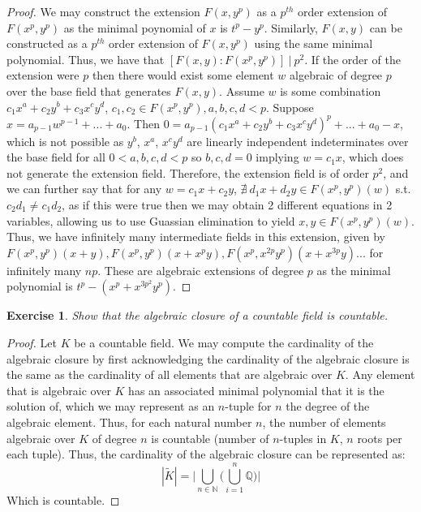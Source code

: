 \documentclass{article}
\newtheorem{exercise}{Exercise}
\begin{document}
\begin{proof}
  We may construct the extension $F(x,y^{p})$ as a $p^{th}$ order extension of $F(x^{p},y^{p})$ as the minimal poynomial of $x$ is $t^{p}-y^{p}$. Similarly, $F(x,y)$ can be constructed as a $p^{th}$ order extension of $F(x,y^{p})$ using the same minimal polynomial. Thus, we have that $[F(x,y):F(x^{p},y^{p})] \ | \  p^{2}$. If the order of the extension were $p$ then there would exist some element $w$ algebraic of degree $p$ over the base field that generates $F(x,y)$. Assume $w$ is some combination $c_{1}x^{a}+c_{2}y^{b}+c_{3}x^{c}y^{d}$, $c_{1},c_{2}\in F(x^{p},y^{p}), a,b,c,d < p$. Suppose $x = a_{p-1}w^{p-1}+...+a_{0}$. Then $0 = a_{p-1}(c_{1}x^{a}+c_{2}y^{b}+c_{3}x^{c}y^{d})^{p} + ... + a_{0} - x$, which is not possible as $y^{b}$, $x^{a}$, $x^{c}y^{d}$ are linearly independent indeterminates over the base field for all $0<a,b,c,d<p$ so $b,c,d = 0$ implying $w = c_{1}x$, which does not generate the extension field. Therefore, the extension field is of order $p^{2}$, and we can further say that for any $w = c_{1}x + c_{2}y$, $\nexists \ d_{1}x + d_{2}y \in F(x^{p},y^{p})(w)$ s.t. $c_{2}d_{1} \neq c_{1}d_{2}$, as if this were true then we may obtain 2 different equations in 2 variables, allowing us to use Guassian elimination to yield $x, y \in F(x^{p}, y^{p})(w)$. Thus, we have infinitely many intermediate fields in this extension, given by $F(x^{p},y^{p})(x+y), F(x^{p},y^{p})(x+x^{p}y), F(x^{p},x^{2p}y^{p})(x+x^{3p}y)...$ for infinitely many $np$. These are algebraic extensions of degree $p$ as the minimal polynomial is $t^{p} - (x^{p}+x^{3p^{2}}y^{p})$.
\end{proof}

\begin{exercise}
  Show that the algebraic closure of a countable field is countable.
\end{exercise}
\begin{proof}
  Let $K$ be a countable field. We may compute the cardinality of the algebraic closure by first acknowledging the cardinality of the algebraic closure is the same as the cardinality of all elements that are algebraic over $K$. Any element that is algebraic over $K$ has an associated minimal polynomial that it is the solution of, which we may represent as an $n$-tuple for $n$ the degree of the algebraic element. Thus, for each natural number $n$, the number of elements algebraic over $K$ of degree $n$ is countable (number of $n$-tuples in $K$, $n$ roots per each tuple). Thus, the cardinality of the algebraic closure can be represented as:
  \[
    | \widetilde K | = \bigg|  \bigcup_{n \in \mathbb{N}}\bigg(\bigcup_{i=1}^{n}\mathbb{Q}\bigg) \bigg|
  \]
  Which is countable.
\end{proof}
\end{document}
